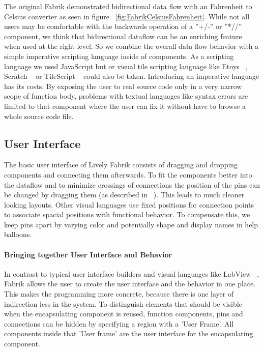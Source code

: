 \documentclass[pdftex, times, 10pt, twocolumn]{article}
\begin{document}
The original Fabrik demonstrated bidirectional data flow with an Fahrenheit to Celsius converter as seen in figure ~\ref{fig:FabrikCelsiusFahrenheit}. While not all users may be comfortable with the backwards operation of a ''+/-'' or ''*//'' component, we think that bidirectional dataflow can be an enriching feature when used at the right level. So we combine the overall data flow behavior with a simple imperative scripting language inside of components.  As a scripting language we used JavaScript but or visual tile scripting language like Etoys ~\cite{Kay2005SEA}, Scratch ~\cite{Maloney2004SSP} or TileScript ~\cite{Warth2008TMS} could also be taken.  Introducing an imperative language has its costs. By exposing the user to real source code only in a very narrow scope of function body, problems with textual languages like syntax errors are limited to that component where the user can fix it without have to browse a whole source code file.  



\subsection{User Interface}
The basic user interface of Lively Fabrik consists of dragging and dropping components and connecting them afterwards. To fit the components better into the dataflow and to minimize crossings of connections the position of the pins can be changed by dragging them (as described in ~\cite{Ludolph1988FPE}). This leads to much cleaner looking layouts. Other visual languages use fixed positions for connection points to associate spacial positions with functional behavior. To compensate this, we keep pins apart by varying  color and potentially shape and display names in help balloons.  



\paragraph{Bringing together User Interface and Behavior}
In contrast to typical user interface builders and visual languages like LabView ~\cite{Bitter2006LAP}, Fabrik allows the user to create the user interface and the behavior in one place. This makes the programming more concrete, because there is one layer of indirection less in the system. To distinguish elements that should be visible when the encapsulating component is reused, function components, pins and connections can be hidden by specifying a region with a 'User Frame'. All components inside that 'User frame' are the user interface for the encapsulating component.  
\end{document}
